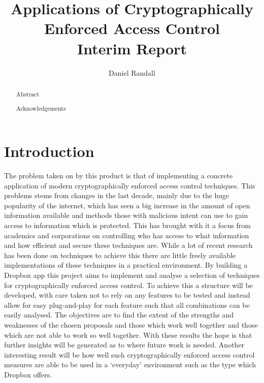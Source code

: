 \documentclass[10pt, titlepage]{article}
\title{Applications of Cryptographically Enforced Access Control \\ Interim Report}
\author{Daniel Randall}
\date{}
\begin{document}
\maketitle

\begin{abstract}
Abstract
\end{abstract}

\renewcommand{\abstractname}{Acknowledgements}
\begin{abstract}
Acknowledgements
\end{abstract}


\newpage
\tableofcontents
\newpage

\newcommand{\defeq}{\stackrel{\textup{\tiny def}}{=}}

\section{Introduction}
The problem taken on by this product is that of implementing a concrete application of modern cryptographically enforced access control techniques. This problems stems from changes in the last decade, mainly due to the huge popularity of the internet, which has seen a big increase in the amount of open information available and methods those with malicious intent can use to gain access to information which is protected. This has brought with it a focus from academics and corporations on controlling who has access to what information and how efficient and secure these techniques are. While a lot of recent research has been done on techniques to achieve this there are little freely available implementations of these techniques in a practical environment.
\newline \indent By building a Dropbox app this project aims to implement and analyse a selection of techniques for cryptographically enforced access control. To achieve this a structure will be developed, with care taken not to rely on any features to be tested and instead allow for easy plug-and-play for each feature such that all combinations can be easily analysed. The objectives are to find the extent of the strengths and weaknesses of the chosen proposals and those which work well together and those which are not able to work so well together. With these results the hope is that further insights will be generated as to where future work is needed. Another interesting result will be how well such cryptographically enforced access control measures are able to be used in a `everyday' environment such as the type which Dropbox offers.
\end{document}
